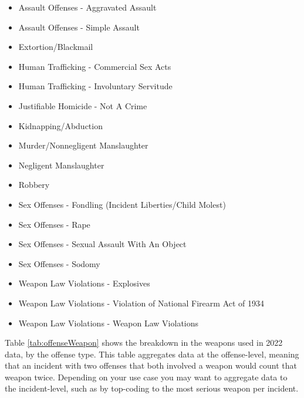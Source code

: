 \documentclass[
]{krantz}
\providecommand{\tightlist}{%
  \setlength{\itemsep}{0pt}\setlength{\parskip}{0pt}}
\begin{document}
\begin{itemize}
\tightlist
\item
  Assault Offenses - Aggravated Assault
\item
  Assault Offenses - Simple Assault
\item
  Extortion/Blackmail
\item
  Human Trafficking - Commercial Sex Acts
\item
  Human Trafficking - Involuntary Servitude
\item
  Justifiable Homicide - Not A Crime
\item
  Kidnapping/Abduction
\item
  Murder/Nonnegligent Manslaughter
\item
  Negligent Manslaughter
\item
  Robbery
\item
  Sex Offenses - Fondling (Incident Liberties/Child Molest)
\item
  Sex Offenses - Rape
\item
  Sex Offenses - Sexual Assault With An Object
\item
  Sex Offenses - Sodomy
\item
  Weapon Law Violations - Explosives
\item
  Weapon Law Violations - Violation of National Firearm Act
  of 1934
\item
  Weapon Law Violations - Weapon Law Violations
\end{itemize}

Table \ref{tab:offenseWeapon} shows the breakdown in the
weapons used in 2022 data, by the offense type. This table
aggregates data at the offense-level, meaning that an
incident with two offenses that both involved a weapon would
count that weapon twice. Depending on your use case you may
want to aggregate data to the incident-level, such as by
top-coding to the most serious weapon per incident.
\end{document}
